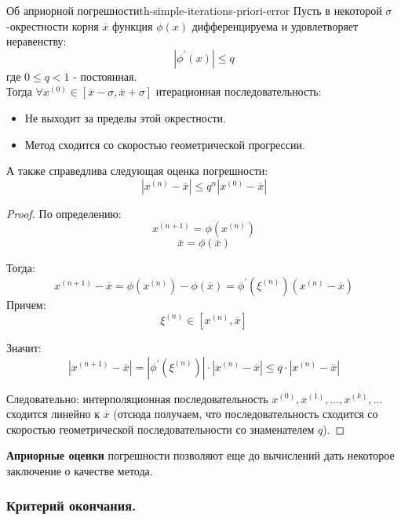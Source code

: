 \documentclass[14pt]{extarticle}
\begin{document}
        \begin{theorem}{Об априорной погрешности}{th-simple-iterations-priori-error}
            Пусть в некоторой $\sigma$-окрестности корня $\overline{x}$ функция $\phi(x)$ дифференцируема и удовлетворяет неравенству:
            $$|\phi^{'}(x)| \leq q$$
            где $0 \leq q < 1$ - постоянная.\\

            Тогда $\forall x^{(0)} \in [\overline{x} - \sigma, \overline{x} + \sigma]$ итерационная последовательность:
            \begin{itemize}
                \item Не выходит за пределы этой окрестности.
                \item Метод сходится со скоростью геометрической прогрессии. 
            \end{itemize}
            А также справедлива следующая оценка погрешности:
            $$|x^{(n)} - \overline{x}| \leq q^{n}|x^{(0)} - \overline{x}|$$

            \begin{proof}
                По определению:
                $$x^{(n + 1)} = \phi(x^{(n)})$$
                $$\overline{x} = \phi(\overline{x})$$

                Тогда:
                $$x^{(n + 1)} - \overline{x} = \phi(x^{(n)}) - \phi(\overline{x}) = \phi^{'}(\xi^{(n)})(x^{(n)} - \overline{x})$$
                Причем:
                $$\xi^{(n)} \in [x^{(n)}, \overline{x}]$$

                Значит:
                $$|x^{(n+1)} - \overline{x}| = |\phi^{'}(\xi^{(n)})| \cdot |x^{(n)} - \overline{x}| \leq q \cdot |x^{(n)} - \overline{x}|$$
            
                Следовательно: интерполяционная последовательность $x^{(0)}, x^{(1)}, \ldots, x^{(k)}, \ldots$ сходится линейно к $\overline{x}$ (отсюда получаем, что последовательность сходится со скоростью геометрической последовательности со знаменателем $q$).
            \end{proof}

        \end{theorem}

        \textbf{Априорные оценки} погрешности позволяют еще до вычислений дать некоторое заключение о качестве метода.

    \subsubsection{Критерий окончания.}
        
\end{document}
